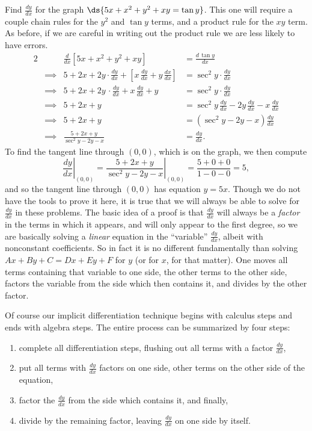 \bex Find $\frac{dy}{dx}$ for the graph $\ds{5x+x^2+y^2+xy=\tan y}$.
\label{UglyImplicitDiffW/TanLine}
This one will require a couple chain rules
for the $y^2$ and $\tan y$ terms, and a product rule
for the $xy$ term.
As before, if we are careful in writing out the product rule
we are less likely to have errors.
\begin{alignat*}{2}
&&\frac{d}{dx}\left[5x+x^2+y^2+xy\right]&=\frac{d\,\tan y}{dx}\\
&\implies&5+2x+2y\cdot\frac{dy}{dx}
+\left[x\,\frac{dy}{dx}+y\,\frac{dx}{dx}\right]&=\sec^2y\cdot\frac{dy}{dx}\\
&\implies&5+2x+2y\,\cdot\frac{dy}{dx}+x\,\frac{dy}{dx}+y
&=\sec^2y\cdot\frac{dy}{dx}\\
&\implies&5+2x+y&=\sec^2y\,\frac{dy}{dx}-2y\,\frac{dy}{dx}-x\,\frac{dy}{dx}\\
&\implies&5+2x+y&=\left(\sec^2y-2y-x\right)\frac{dy}{dx}\\
&\implies&\frac{5+2x+y}{\sec^2y-2y-x}&=\frac{dy}{dx}.
\end{alignat*}
To find the tangent line through $(0,0)$, which is on the graph, we then 
compute
$$\left.\frac{dy}{dx}\right|_{(0,0)}=\left.\frac{5+2x+y}{\sec^2y-2y-x}
  \right|_{(0,0)}=\frac{5+0+0}{1-0-0}=5,$$
and so the tangent line through $(0,0)$ has equation $y=5x$.
\eex
Though we do not have the tools to prove it here, 
it is true that we
will always be able to solve for $\frac{dy}{dx}$
in these problems.  The basic idea of a proof is that
$\frac{dy}{dx}$ will always be a {\it factor} in the terms in which
it appears, and will only appear to the
first degree, so we are basically solving a {\it linear} equation in the 
``variable'' $\frac{dy}{dx}$, albeit with nonconstant coefficients.
So in fact it is no different fundamentally than
solving $Ax+By+C=Dx+Ey+F$ for $y$ (or for $x$, for that matter).
One  moves all terms containing
that variable to one side, the other terms to the other side, factors
the variable from the side which then contains it, and divides by the other
factor.

Of course our implicit differentiation technique begins with calculus
steps and ends with algebra steps.  The entire process can be summarized by
four steps:

\begin{enumerate}[(1)]
\item complete all differentiation steps, flushing out all
terms with a factor $\frac{dy}{dx}$,
\item put all terms with $\frac{dy}{dx}$ factors on one side,
other terms on the other side of the equation,
\item factor the $\frac{dy}{dx}$ from the side which
contains it, and finally,
\item divide by the remaining factor, leaving $\frac{dy}{dx}$
on one side by itself.
\end{enumerate}

